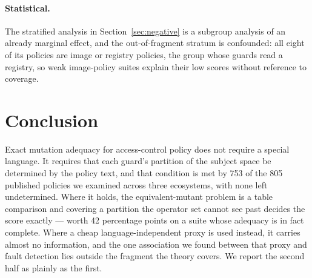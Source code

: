 \documentclass[11pt,a4paper]{article}
\theoremstyle{plain}
\theoremstyle{definition}
\theoremstyle{remark}
\begin{document}
\paragraph{Statistical.} The stratified analysis in Section~\ref{sec:negative} is a
subgroup analysis of an already marginal effect, and the out-of-fragment stratum is
confounded: all eight of its policies are image or registry policies, the group whose guards
read a registry, so weak image-policy suites explain their low scores without reference to
coverage.

\section{Conclusion}

Exact mutation adequacy for access-control policy does not require a special language. It
requires that each guard's partition of the subject space be determined by the policy text,
and that condition is met by 753 of the 805 published policies we examined across three
ecosystems, with none left undetermined. Where it holds, the equivalent-mutant problem is a table
comparison and covering a partition the operator set cannot see past decides the score
exactly --- worth 42 percentage points on a suite whose adequacy is in fact complete. Where a cheap language-independent proxy is used
instead, it carries almost no information, and the one association we found between that
proxy and fault detection lies outside the fragment the theory covers. We report the second
half as plainly as the first.



\end{document}
